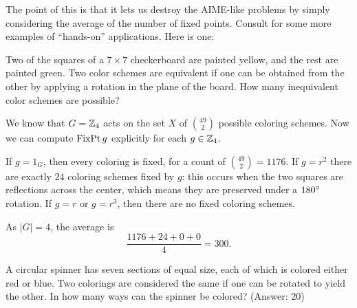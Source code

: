 The point of this is that it lets us destroy the AIME-like problems by simply considering the average of the number of fixed points.
Consult \cite{ref:aops_burnside} 
for some more examples of ``hands-on'' applications.
Here is one:
\begin{example}
	[AIME 1996]
	Two of the squares of a $7 \times 7$ checkerboard are painted yellow, and the rest are painted green. Two color schemes are equivalent if one can be obtained from the other by applying a rotation in the plane of the board. How many inequivalent color schemes are possible?

	We know that $G = \mathbb Z_{4}$ acts on the set $X$ of $\binom{49}{2}$ possible coloring schemes.
	Now we can compute $\operatorname{FixPt} g$ explicitly for each $g \in \mathbb Z_{4}$.
	\begin{itemize}
		\ii If $g = 1_G$, then every coloring is fixed, for a count of $\binom{49}{2} = 1176$.
		\ii If $g = r^2$ there are exactly $24$ coloring schemes fixed by $g$:
		this occurs when the two squares are reflections across the center,
		which means they are preserved under a $180^\circ$ rotation.
		\ii If $g = r$ or $g=r^3$, then there are no fixed coloring schemes.
	\end{itemize}
	As $\left\lvert G \right\rvert = 4$, the average is
	\[ \frac{1176 + 24 + 0 + 0}{4} = 300. \]
\end{example}
\begin{exercise}
	A circular spinner has seven sections of equal size,
	each of which is colored either red or blue.
	Two colorings are considered the same if one can be rotated to yield the other.
	In how many ways can the spinner be colored? (Answer: 20)
\end{exercise}


